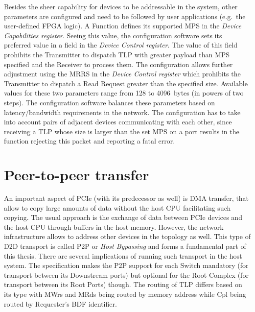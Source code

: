 Besides the sheer capability for devices to be addressable in the system, other parameters are
configured and need to be followed by user applications (e.g.\ the user-defined FPGA logic). A
Function defines its supported \ac{MPS} in the \emph{Device Capabilities register}. Seeing this
value, the configuration software sets its preferred value in a field in the \emph{Device Control
register}. The value of this field prohibits the Transmitter to dispatch TLP with greater payload
than MPS specified and the Receiver to process them. The configuration allows further adjustment
using the \ac{MRRS} in the \emph{Device Control register} which prohibits the Transmitter to
dispatch a Read Request greater than the specified size. Available values for these two parameters
range from 128 to 4096~bytes (in powers of two steps). The configuration software balances these
parameters based on latency/bandwidth requirements in the network. The configuration has to take
into account pairs of adjacent devices communicating with each other, since receiving a TLP whose
size is larger than the set MPS on a port results in the function rejecting this packet and
reporting a fatal error\footnotemark.



\section{Peer-to-peer transfer}

An important aspect of PCIe (with its predecessor as well) is \ac{DMA} transfer,
that allow to copy large amounts of data without the host CPU facilitating such copying. The usual
approach is the exchange of data between PCIe devices and the host CPU through buffers in the host
memory. However, the network infrastructure allows to address other devices in the topology as well.
This type of \ac{D2D} transport is called \ac{P2P} or \emph{Host Bypassing} and forms a fundamental
part of this thesis. There are several implications of running such transport in the host system.
The specification makes the P2P support for each Switch mandatory (for transport between its
Downstream ports) but optional for the Root Complex (for transport between its Root Ports) though.
The routing of TLP differs based on its type with \acp{MWr} and \acp{MRd} being routed by memory
address while \acs{Cpl} being routed by Requester's BDF identifier\cite{pcie_spec}.

